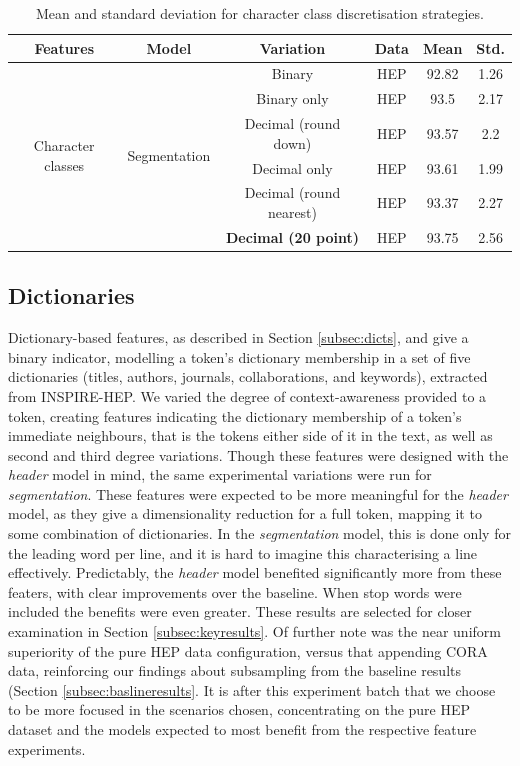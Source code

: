 \begin{table}[h]
\begin{center}
\begin{tabular}{|c|c|c|c|c|c|}
\hline
Features & Model & Variation & Data & Mean & Std.\\
\hline
\multirow{6}{*}{Character classes} & \multirow{6}{*}{Segmentation} & Binary & HEP & 92.82 & 1.26\\\cline{3-6}
& & Binary only & HEP & 93.5 & 2.17\\\cline{3-6}
& & Decimal (round down) & HEP & 93.57 & 2.2\\\cline{3-6}
& & Decimal only & HEP & 93.61 & 1.99\\\cline{3-6}
& & Decimal (round nearest) & HEP & 93.37 & 2.27\\\cline{3-6}
& & \textbf{Decimal (20 point)} & HEP & 93.75 & 2.56\\\cline{3-6}
\hline
\end{tabular}
\caption[Mean and standard deviation for character class discretisation strategies.]{Mean and standard deviation for character class discretisation strategies.}
\label{table:characterclassresults}
\end{center}
\end{table}

\subsection{Dictionaries}

Dictionary-based features, as described in Section \ref{subsec:dicts}, and give a binary indicator, modelling a token's dictionary membership in a set of five dictionaries (titles, authors, journals, collaborations, and keywords), extracted from INSPIRE-HEP. We varied the degree of context-awareness provided to a token, creating features indicating the dictionary membership of a token's immediate neighbours, that is the tokens either side of it in the text, as well as second and third degree variations. Though these features were designed with the \emph{header} model in mind, the same experimental variations were run for \emph{segmentation}. These features were expected to be more meaningful for the \emph{header} model, as they give a dimensionality reduction for a full token, mapping it to some combination of dictionaries. In the \emph{segmentation} model, this is done only for the leading word per line, and it is hard to imagine this characterising a line effectively. Predictably, the \emph{header} model benefited significantly more from these featers, with clear improvements over the baseline. When stop words were included the benefits were even greater. These results are selected for closer examination in Section \ref{subsec:keyresults}. Of further note was the near uniform superiority of the pure HEP data configuration, versus that appending CORA data, reinforcing our findings about subsampling from the baseline results (Section \ref{subsec:baslineresults}. It is after this experiment batch that we choose to be more focused in the scenarios chosen, concentrating on the pure HEP dataset and the models expected to most benefit from the respective feature experiments.

